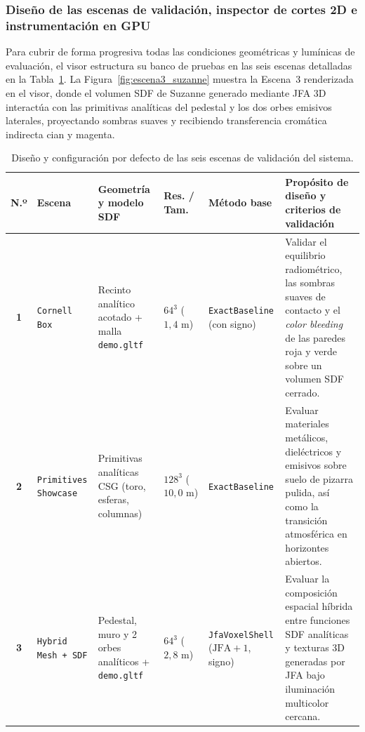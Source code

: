 \subsubsection{Diseño de las escenas de validación, inspector de cortes 2D e instrumentación en GPU}

Para cubrir de forma progresiva todas las condiciones geométricas y lumínicas de evaluación, el visor estructura su banco de pruebas en las seis escenas detalladas en la Tabla~\ref{tab:escenas_diseno}. La Figura~\ref{fig:escena3_suzanne} muestra la Escena~3 renderizada en el visor, donde el volumen SDF de Suzanne generado mediante JFA 3D interactúa con las primitivas analíticas del pedestal y los dos orbes emisivos laterales, proyectando sombras suaves y recibiendo transferencia cromática indirecta cian y magenta.

\begin{table}[htbp]
  \centering
  \footnotesize
  \caption{Diseño y configuración por defecto de las seis escenas de validación del sistema.}
  \label{tab:escenas_diseno}
  \begin{tabularx}{\textwidth}{|>{\bfseries}c|>{\bfseries\raggedright\arraybackslash}p{22mm}|>{\raggedright\arraybackslash}p{28mm}|>{\raggedright\arraybackslash}p{17mm}|>{\raggedright\arraybackslash}p{25mm}|>{\raggedright\arraybackslash}X|}
    \hline
    \rowcolor{tablegray} N.º & Escena & Geometría y modelo SDF & Res. / Tam. & Método base & Propósito de diseño y criterios de validación \\ \hline
    1 & \texttt{Cornell Box} & Recinto analítico acotado + malla \texttt{demo.gltf} & $64^3$ \newline ($1,4\text{ m}$) & \texttt{ExactBaseline} (con signo) & Validar el equilibrio radiométrico, las sombras suaves de contacto y el \textit{color bleeding} de las paredes roja y verde sobre un volumen SDF cerrado. \\ \hline
    2 & \texttt{Primitives Showcase} & Primitivas analíticas CSG (toro, esferas, columnas) & $128^3$ \newline ($10,0\text{ m}$) & \texttt{ExactBaseline} & Evaluar materiales metálicos, dieléctricos y emisivos sobre suelo de pizarra pulida, así como la transición atmosférica en horizontes abiertos. \\ \hline
    3 & \texttt{Hybrid Mesh + SDF} & Pedestal, muro y 2 orbes analíticos + \texttt{demo.gltf} & $64^3$ \newline ($2,8\text{ m}$) & \texttt{JfaVoxelShell} ($\text{JFA}+1$, signo) & Evaluar la composición espacial híbrida entre funciones SDF analíticas y texturas 3D generadas por JFA bajo iluminación multicolor cercana. \\ \hline

\end{tabularx}
\end{table}
